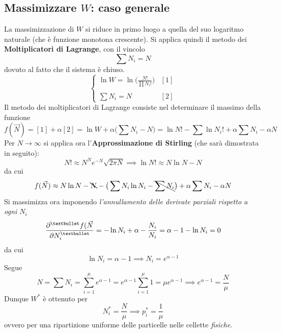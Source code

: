 \documentclass[10pt, oneside]{book}
\newcommand{\ds}{\displaystyle}
\begin{document}
\subsection{Massimizzare $W$: caso generale}
La massimizzazione di $W$ si riduce in primo luogo a quella del suo logaritmo naturale (che è funzione monotona crescente). Si applica quindi il metodo dei \textbf{Moltiplicatori di Lagrange}, con il vincolo 
\[\sum N_i = N\]
dovuto al fatto che il sistema è chiuso.
\[\begin{cases} \displaystyle \ln W = \ln \bigg( \ds \frac{N!}{\prod N_i !} \bigg) & [1] \\ \\ \displaystyle \sum N_i = N & [2]
\end{cases}\]
Il metodo dei moltiplicatori di Lagrange consiste nel determinare il massimo della funzione
\[f(\vec{N}) = [1] + \alpha [2] = \ln W + \alpha \big(\sum N_i - N \big) = \ln N! - \sum \ln N_i! + \alpha \sum N_i - \alpha N\]
Per $N \rightarrow \infty$ si applica ora l'\textbf{Approssimazione di Stirling} (che sarà dimostrata in seguito):
\[N! \approx N^N e^{-N} \sqrt{2 \pi N} \implies \ln N! \approx N \ln N - N\]
da cui
\[f(\vec{N}) \approx N \ln N - \bcancel{N} - \big(\sum N_i \ln N_i - \bcancel{\sum N_i}\big) + \alpha \sum N_i - \alpha N\]
Si massimizza ora imponendo \textit{l'annullamento delle derivate parziali rispetto a ogni $N_i$}
\[\pdv[•]{f(\vec{N}}{N_i} = - \ln N_i + \alpha - \frac{N_i}{N_i} = \alpha - 1 - \ln N_i = 0\]
da cui
\[\ln N_i = \alpha - 1 \implies N_i = e^{\alpha - 1}\]
Segue
\[N = \sum N_i = \sum\limits_{i=1}^\mu e^{\alpha -1} = e^{\alpha - 1} \sum\limits_{i=1}^\mu 1 = \mu e^{\alpha - 1} \implies e^{\alpha - 1} = \frac{N}{\mu}\]
Dunque $\ds W^\ast$ è ottenuto per
\[N_i^\ast = \frac{N}{\mu} \implies p_i^\ast = \frac{1}{\mu}\]
ovvero per una ripartizione uniforme delle particelle nelle cellette \textit{fisiche}.
\end{document}

